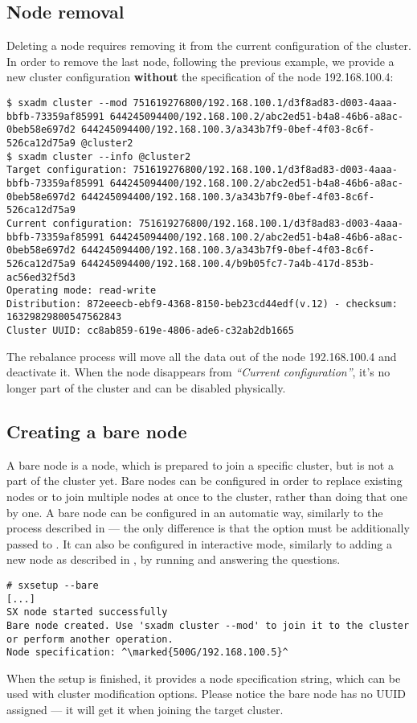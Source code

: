 \subsection{Node removal}
Deleting a node requires removing it from the current configuration of the
cluster. In order to remove the last node, following the previous example,
we provide a new cluster configuration \textbf{without} the specification
of the node 192.168.100.4:
\begin{lstlisting}
$ sxadm cluster --mod 751619276800/192.168.100.1/d3f8ad83-d003-4aaa-bbfb-73359af85991 644245094400/192.168.100.2/abc2ed51-b4a8-46b6-a8ac-0beb58e697d2 644245094400/192.168.100.3/a343b7f9-0bef-4f03-8c6f-526ca12d75a9 @cluster2
$ sxadm cluster --info @cluster2
Target configuration: 751619276800/192.168.100.1/d3f8ad83-d003-4aaa-bbfb-73359af85991 644245094400/192.168.100.2/abc2ed51-b4a8-46b6-a8ac-0beb58e697d2 644245094400/192.168.100.3/a343b7f9-0bef-4f03-8c6f-526ca12d75a9 
Current configuration: 751619276800/192.168.100.1/d3f8ad83-d003-4aaa-bbfb-73359af85991 644245094400/192.168.100.2/abc2ed51-b4a8-46b6-a8ac-0beb58e697d2 644245094400/192.168.100.3/a343b7f9-0bef-4f03-8c6f-526ca12d75a9 644245094400/192.168.100.4/b9b05fc7-7a4b-417d-853b-ac56ed32f5d3 
Operating mode: read-write
Distribution: 872eeecb-ebf9-4368-8150-beb23cd44edf(v.12) - checksum: 16329829800547562843
Cluster UUID: cc8ab859-619e-4806-ade6-c32ab2db1665
\end{lstlisting}
The rebalance process will move all the data out of the node 192.168.100.4 and
deactivate it. When the node disappears from \emph{``Current configuration''}, it's no
longer part of the cluster and can be disabled physically.

\subsection{Creating a bare node}
A bare node is a node, which is prepared to join a specific cluster, but is
not a part of the cluster yet. Bare nodes can be configured in order to
replace existing nodes or to join multiple nodes at once to the cluster,
rather than doing that one by one. A bare node can be configured in an
automatic way, similarly to the process described in 
--- the only difference is that the option  must be additionally
passed to . It can also be configured in interactive mode,
similarly to adding a new node as described in , by
running  and answering the questions.
\begin{lstlisting}
# sxsetup --bare
[...]
SX node started successfully
Bare node created. Use 'sxadm cluster --mod' to join it to the cluster
or perform another operation.
Node specification: ^\marked{500G/192.168.100.5}^
\end{lstlisting}
When the setup is finished, it provides a node specification string, which
can be used with cluster modification options. Please notice the bare node
has no UUID assigned --- it will get it when joining the target cluster.

